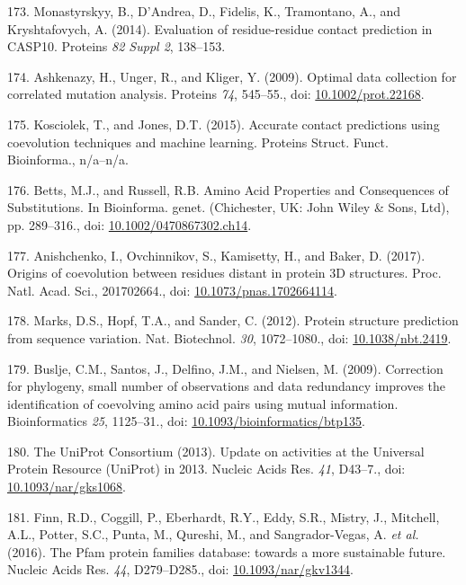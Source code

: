 \documentclass[11pt,a4paper,twoside]{book}
\theoremstyle{definition}
\theoremstyle{definition}
\theoremstyle{remark}
\begin{document}
\hypertarget{ref-Monastyrskyy2014a}{}
173. Monastyrskyy, B., D'Andrea, D., Fidelis, K., Tramontano, A., and
Kryshtafovych, A. (2014). Evaluation of residue-residue contact
prediction in CASP10. Proteins \emph{82 Suppl 2}, 138--153.

\hypertarget{ref-Ashkenazy2009}{}
174. Ashkenazy, H., Unger, R., and Kliger, Y. (2009). Optimal data
collection for correlated mutation analysis. Proteins \emph{74},
545--55., doi:
\href{https://doi.org/10.1002/prot.22168}{10.1002/prot.22168}.

\hypertarget{ref-Kosciolek2015a}{}
175. Kosciolek, T., and Jones, D.T. (2015). Accurate contact predictions
using coevolution techniques and machine learning. Proteins Struct.
Funct. Bioinforma., n/a--n/a.

\hypertarget{ref-Bettsa}{}
176. Betts, M.J., and Russell, R.B. Amino Acid Properties and
Consequences of Substitutions. In Bioinforma. genet. (Chichester, UK:
John Wiley \& Sons, Ltd), pp. 289--316., doi:
\href{https://doi.org/10.1002/0470867302.ch14}{10.1002/0470867302.ch14}.

\hypertarget{ref-Anishchenko2017}{}
177. Anishchenko, I., Ovchinnikov, S., Kamisetty, H., and Baker, D.
(2017). Origins of coevolution between residues distant in protein 3D
structures. Proc. Natl. Acad. Sci., 201702664., doi:
\href{https://doi.org/10.1073/pnas.1702664114}{10.1073/pnas.1702664114}.

\hypertarget{ref-Marks2012}{}
178. Marks, D.S., Hopf, T.A., and Sander, C. (2012). Protein structure
prediction from sequence variation. Nat. Biotechnol. \emph{30},
1072--1080., doi:
\href{https://doi.org/10.1038/nbt.2419}{10.1038/nbt.2419}.

\hypertarget{ref-Buslje2009}{}
179. Buslje, C.M., Santos, J., Delfino, J.M., and Nielsen, M. (2009).
Correction for phylogeny, small number of observations and data
redundancy improves the identification of coevolving amino acid pairs
using mutual information. Bioinformatics \emph{25}, 1125--31., doi:
\href{https://doi.org/10.1093/bioinformatics/btp135}{10.1093/bioinformatics/btp135}.

\hypertarget{ref-TheUniProtConsortium2013}{}
180. The UniProt Consortium (2013). Update on activities at the
Universal Protein Resource (UniProt) in 2013. Nucleic Acids Res.
\emph{41}, D43--7., doi:
\href{https://doi.org/10.1093/nar/gks1068}{10.1093/nar/gks1068}.

\hypertarget{ref-Finn2016}{}
181. Finn, R.D., Coggill, P., Eberhardt, R.Y., Eddy, S.R., Mistry, J.,
Mitchell, A.L., Potter, S.C., Punta, M., Qureshi, M., and
Sangrador-Vegas, A. \emph{et al.} (2016). The Pfam protein families
database: towards a more sustainable future. Nucleic Acids Res.
\emph{44}, D279--D285., doi:
\href{https://doi.org/10.1093/nar/gkv1344}{10.1093/nar/gkv1344}.
\end{document}
